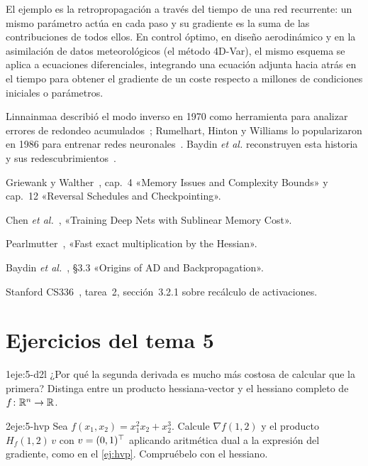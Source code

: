 El ejemplo es la retropropagación a través del tiempo de una red recurrente: un mismo parámetro actúa en cada paso y su gradiente es la suma de las contribuciones de todos ellos. En control óptimo, en diseño aerodinámico y en la asimilación de datos meteorológicos (el método 4D-Var), el mismo esquema se aplica a ecuaciones diferenciales, integrando una ecuación adjunta hacia atrás en el tiempo para obtener el gradiente de un coste respecto a millones de condiciones iniciales o parámetros.

\begin{observacion}[Historia]
Linnainmaa describió el modo inverso en 1970 como herramienta para analizar errores de redondeo acumulados~\cite{linnainmaa}; Rumelhart, Hinton y Williams lo popularizaron en 1986 para entrenar redes neuronales~\cite{rumelhart}. Baydin \emph{et al.} reconstruyen esta historia y sus redescubrimientos~\cite[§3.3]{baydin}.
\end{observacion}

\begin{lecturas}
\item Griewank y Walther~\cite{gw}, cap.~4 «Memory Issues and Complexity Bounds» y cap.~12 «Reversal Schedules and Checkpointing».
\item Chen \emph{et al.}~\cite{chen}, «Training Deep Nets with Sublinear Memory Cost».
\item Pearlmutter~\cite{pearlmutter}, «Fast exact multiplication by the Hessian».
\item Baydin \emph{et al.}~\cite{baydin}, §3.3 «Origins of AD and Backpropagation».
\item Stanford CS336~\cite{cs336a2}, tarea~2, sección~3.2.1 sobre recálculo de activaciones.
\end{lecturas}

\section*{Ejercicios del tema 5}

\begin{ejercicio}{1}{eje:5-d2l}
¿Por qué la segunda derivada es mucho más costosa de calcular que la primera? Distinga entre un producto hessiana-vector y el hessiano completo de $f\colon\mathbb{R}^{n}\to\mathbb{R}$.
\end{ejercicio}

\begin{ejercicio}{2}{eje:5-hvp}
Sea $f(x_1,x_2)=x_1^{2}x_2+x_2^{3}$. Calcule $\nabla f(1,2)$ y el producto $H_f(1,2)\,v$ con $v=(0,1)^{\top}$ aplicando aritmética dual a la expresión del gradiente, como en el \cref{ej:hvp}. Compruébelo con el hessiano.
\end{ejercicio}

